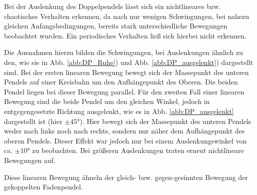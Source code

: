\documentclass[11pt,a4paper,titlepage, ngerman]{article}
\newcommand{\refabb}[1]{Abb. \ref{abb:#1}}
\begin{document}
			Bei der Auslenkung des Doppelpendels lässt sich ein nichtlineares bzw. chaotisches Verhalten erkennen, da nach nur wenigen Schwingungen, bei nahezu gleichen Anfangsbedingungen, bereits stark unterschiedliche Bewegungen beobachtet wurden. Ein periodisches Verhalten ließ sich hierbei nicht erkennen.
		
			Die Ausnahmen hierzu bilden die Schwingungen, bei Auslenkungen ähnlich zu den, wie sie in \refabb{DP_Ruhe}) und \refabb{DP_ausgelenkt}) dargestellt sind. Bei der ersten linearen Bewegung bewegt sich der Massepunkt des unteren Pendels auf einer Kreisbahn um den Aufhängepunkt des Oberen. Die beiden Pendel liegen bei dieser Bewegung parallel. Für den zweiten Fall einer linearen Bewegung sind die beide Pendel um den gleichen Winkel, jedoch in entgegengesetzte Richtung ausgelenkt, wie es in \refabb{DP_ausgelenkt} dargestellt ist (hier $\pm \ang{45}$). Hier bewegt sich der Massepunkt des unteren Pendels weder nach links noch nach rechts, sondern nur näher dem Aufhängepunkt des oberen Pendels. Dieser Effekt war jedoch nur bei einem Auslenkungswinkel von ca. $\pm \ang{10}$ zu beobachten. Bei größeren Auslenkungen traten erneut nichtlineare Bewegungen auf.
			
			Diese linearen Bewegung ähneln der gleich- bzw. gegen-gesinnten Bewegung der gekoppelten Fadenpendel.  
\end{document}
